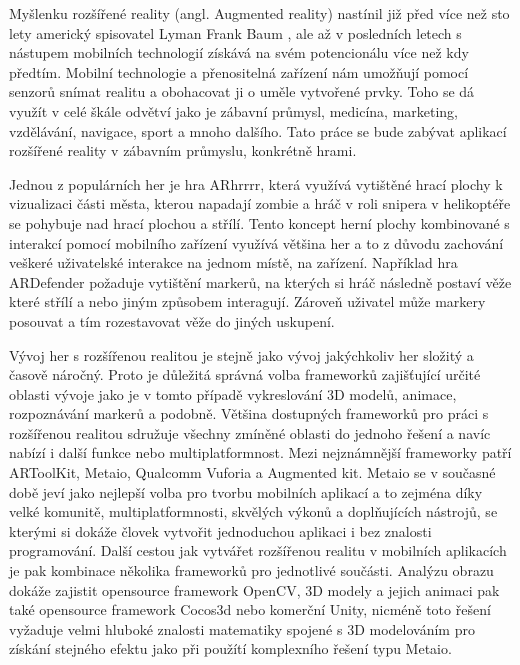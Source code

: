 \documentclass[oneside,12pt]{article}
\begin{document}
\def\,{\penalty10000\hskip.25em}
\pagestyle{headings}
\bakalarska
{}

\obsah

\newpage
%
%
% 
Myšlenku rozšířené reality (angl. Augmented reality) nastínil již před více než sto lety americký spisovatel Lyman Frank Baum \cite{baum}, ale až v posledních letech s nástupem mobilních technologií získává na svém potencionálu více než kdy předtím. Mobilní technologie a přenositelná zařízení nám umožňují pomocí senzorů snímat realitu a obohacovat ji o uměle vytvořené prvky. Toho se dá využít v celé škále odvětví jako je zábavní průmysl, medicína, marketing, vzdělávání, navigace, sport a mnoho dalšího. Tato práce se bude zabývat aplikací rozšířené reality v zábavním průmyslu, konkrétně hrami. 

Jednou z populárních her je hra ARhrrrr, která využívá vytištěné hrací plochy k vizualizaci části města, kterou napadají zombie a hráč v roli snipera v helikoptéře se pohybuje nad hrací plochou a střílí. Tento koncept herní plochy kombinované s interakcí pomocí mobilního zařízení využívá většina her a to z důvodu zachování veškeré uživatelské interakce na jednom místě, na zařízení. Například hra ARDefender požaduje vytištění markerů, na kterých si hráč následně postaví věže které střílí a nebo jiným způsobem interagují. Zároveň uživatel může markery posouvat a tím rozestavovat věže do jiných uskupení.

Vývoj her s rozšířenou realitou je stejně jako vývoj jakýchkoliv her složitý a časově náročný. Proto je důležitá správná volba frameworků zajišťující určité oblasti vývoje jako je v tomto případě vykreslování 3D modelů, animace, rozpoznávání markerů a podobně. Většina dostupných frameworků pro práci s rozšířenou realitou sdružuje všechny zmíněné oblasti do jednoho řešení a navíc nabízí i další funkce nebo multiplatformnost. Mezi nejznámnější frameworky patří ARToolKit, Metaio, Qualcomm Vuforia a Augmented kit. Metaio se v současné době jeví jako nejlepší volba pro tvorbu mobilních aplikací a to zejména díky velké komunitě, multiplatformnosti, skvělých výkonů a doplňujících nástrojů, se kterými si dokáže človek vytvořit jednoduchou aplikaci i bez znalosti programování. Další cestou jak vytvářet rozšířenou realitu v mobilních aplikacích je pak kombinace několika frameworků pro jednotlivé součásti. Analýzu obrazu dokáže zajistit opensource framework OpenCV, 3D modely a jejich animaci pak také opensource framework Cocos3d nebo komerční Unity, nicméně toto řešení vyžaduje velmi hluboké znalosti matematiky spojené s 3D modelováním pro získání stejného efektu jako při použítí komplexního řešení typu Metaio.
\end{document}
